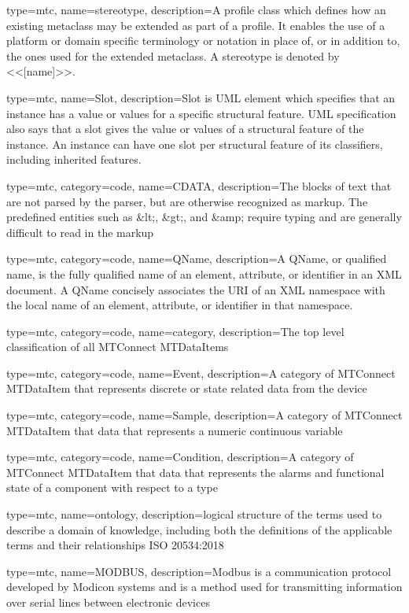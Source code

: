 {
  type=mtc,
  name=stereotype,
  description={A profile class which defines how an existing metaclass may be extended as part of a profile. It enables the use of a platform or domain specific terminology or notation in place of, or in addition to, the ones used for the extended metaclass. A stereotype is denoted by <<[name]>>.}
}

{
  type=mtc,
  name=Slot,
  description={Slot is UML element which specifies that an instance has a value or values for a specific structural feature. UML specification also says that a slot gives the value or values of a structural feature of the instance. An instance can have one slot per structural feature of its classifiers, including inherited features.}
}

{
  type=mtc,
  category=code,
  name=CDATA,
  description={The blocks of text that are not parsed by the parser, but are otherwise recognized as markup. The predefined entities such as \&lt;, \&gt;, and \&amp; require typing and are generally difficult to read in the markup}
}

{
  type=mtc,
  category=code,
  name=QName,
  description={A QName, or qualified name, is the fully qualified name of an element, attribute, or identifier in an XML document. A QName concisely associates the URI of an XML namespace with the local name of an element, attribute, or identifier in that namespace.}
}

{
  type=mtc,
  category=code,
  name=category,
  description={The top level classification of all MTConnect \glspl{MTDataItem}}
}


{
  type=mtc,
  category=code,
  name=Event,
  description={A category of MTConnect \gls{MTDataItem} that represents discrete or state related data from the device}
}

{
  type=mtc,
  category=code,
  name=Sample,
  description={A category of MTConnect \gls{MTDataItem} that data that represents a numeric continuous variable}
}

{
  type=mtc,
  category=code,
  name=Condition,
  description={A category of MTConnect \gls{MTDataItem} that data that represents the alarms and functional state of a component with respect to a \gls{type}}
}

{
  type=mtc,
  name=ontology,
  description={logical structure of the terms used to describe a domain of knowledge, including both the definitions of the applicable terms and their relationships ISO 20534:2018}
}

{
  type=mtc,
  name=MODBUS,
  description={Modbus is a communication protocol developed by Modicon systems and is a method used for transmitting information over serial lines between electronic devices}
}

